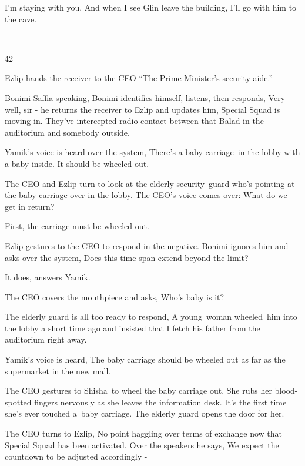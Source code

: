 \documentclass[twoside,11pt]{book}
\begin{document}
{\textquotedbl}I'm staying with you. And when I see Glin leave the building, I'll go with him to the
cave.{\textquotedbl} 

~

42\ \ 

Ezlip hands the receiver to the CEO ``The Prime Minister's security aide.'' 

{\textquotedbl}Bonimi Saffia speaking,{\textquotedbl} Bonimi identifies himself, listens, then responds,
{\textquotedbl}Very well, sir -{\textquotedbl} he returns the receiver to Ezlip and updates him, {\textquotedbl}Special
Squad is moving in. They've intercepted radio contact between that Balad in the auditorium and somebody
outside.{\textquotedbl} 

Yamik's voice is heard over the system, {\textquotedbl}There's a baby carriage\ in the lobby with a baby inside. It
should be wheeled out.{\textquotedbl}

The CEO and Ezlip turn to look at the elderly security{\ }guard who's pointing
at the baby carriage over in the lobby. The CEO's voice comes over: {\textquotedbl}What do we get in
return?{\textquotedbl} 

{\textquotedbl}First, the carriage must be wheeled out.{\textquotedbl} 

Ezlip gestures to the CEO to respond in the negative. Bonimi ignores him and asks over the system, {\textquotedbl}Does
this time span extend beyond the limit?{\textquotedbl}

{\textquotedbl}It does,{\textquotedbl} answers Yamik{.}

The CEO covers the mouthpiece and asks, {\textquotedbl}Who's baby is it?{\textquotedbl} \ 

The elderly guard is all too ready to respond, {\textquotedbl}A young{\ }woman
wheeled\ him into the lobby a short time ago and insisted that I fetch his father from the auditorium right
away.{\textquotedbl} 

Yamik's voice is heard, {\textquotedbl}The baby carriage should be wheeled out as far as the supermarket in the new
mall.{\textquotedbl}\ 

The CEO gestures to Shisha~to wheel the baby carriage out. She rubs her blood-spotted fingers nervously as she leaves
the information desk. It's the first time she's ever touched a~baby carriage. The elderly guard opens the door for her.

The CEO turns to Ezlip, {\textquotedbl}No point haggling over terms of exchange now that Special Squad has been
activated.{\textquotedbl} Over the speakers he says, {\textquotedbl}We expect the countdown to be adjusted accordingly
-{\textquotedbl} 
\end{document}
